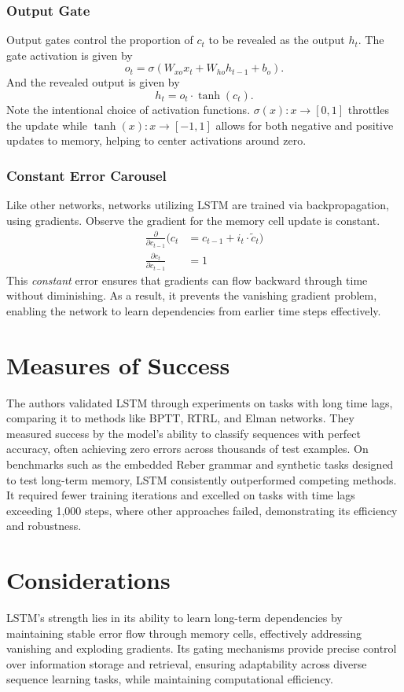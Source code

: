 \documentclass[10pt]{article}
\begin{document}
\subsubsection*{Output Gate}
Output gates control the proportion of $c_t$ to be revealed as the output $h_t$. The gate activation is given by
\[
    o_t = \sigma(W_{xo} x_t + W_{ho} h_{t-1} + b_o).
\]
And the revealed output is given by
\[
    h_t = o_t \cdot \tanh(c_t).
\]
Note the intentional choice of activation functions. \(\sigma(x): x \rightarrow [0, 1]\) throttles the update while \(\tanh(x): x \rightarrow [-1, 1]\) allows for both negative and positive updates to memory, helping to center activations around zero.

\subsubsection*{Constant Error Carousel}
Like other networks, networks utilizing LSTM are trained via backpropagation, using gradients. Observe the gradient for the memory cell update is constant.
\begin{align*}
    \frac{\partial}{\partial c_{t-1}} (c_t & = c_{t-1} + i_t \cdot \tilde{c}_t) \\
    \frac{\partial c_t}{\partial c_{t-1}}  & = 1
\end{align*}
This \textit{constant} error ensures that gradients can flow backward through time without diminishing. As a result, it prevents the vanishing gradient problem, enabling the network to learn dependencies from earlier time steps effectively.

\section*{Measures of Success}
The authors validated LSTM through experiments on tasks with long time lags, comparing it to methods like BPTT\cite{WERBOS1988339,williams1992gradient}, RTRL\cite{robinson1987utility}, and Elman networks\cite{ELMAN1990179}. They measured success by the model's ability to classify sequences with perfect accuracy, often achieving zero errors across thousands of test examples. On benchmarks such as the embedded Reber grammar and synthetic tasks designed to test long-term memory, LSTM consistently outperformed competing methods. It required fewer training iterations and excelled on tasks with time lags exceeding 1,000 steps, where other approaches failed, demonstrating its efficiency and robustness.

\section*{Considerations}
LSTM's strength lies in its ability to learn long-term dependencies by maintaining stable error flow through memory cells, effectively addressing vanishing and exploding gradients. Its gating mechanisms provide precise control over information storage and retrieval, ensuring adaptability across diverse sequence learning tasks, while maintaining computational efficiency.
\end{document}
